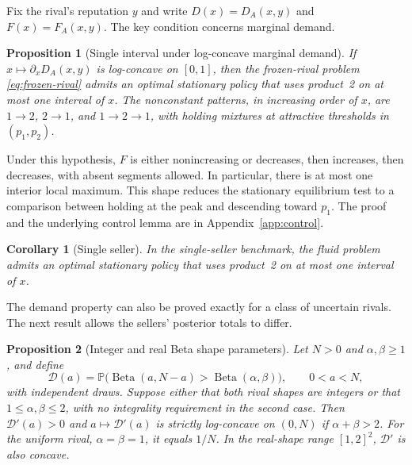 \documentclass[11pt]{article}
\newcommand{\Pb}{\mathbb P}
\DeclareMathOperator{\Beta}{Beta}
\newtheorem{proposition}{Proposition}
\newtheorem{corollary}{Corollary}
\theoremstyle{definition}
\begin{document}
Fix the rival's reputation $y$ and write $D(x)=D_A(x,y)$ and
$F(x)=F_A(x,y)$. The key condition concerns marginal demand.

\begin{proposition}[Single interval under log-concave marginal demand]
\label{prop:frozen-reduction}
If $x\mapsto\partial_xD_A(x,y)$ is log-concave on $[0,1]$, then the
frozen-rival problem \eqref{eq:frozen-rival} admits an optimal stationary
policy that uses product~2 on at most one interval of $x$. The nonconstant
patterns, in increasing order of $x$, are $1\to2$, $2\to1$, and
$1\to2\to1$, with holding mixtures at attractive thresholds in
$(p_1,p_2)$.
\end{proposition}

Under this hypothesis, $F$ is either nonincreasing or decreases, then
increases, then decreases, with absent segments allowed. In particular,
there is at most one interior local maximum. This shape reduces the
stationary equilibrium test to a comparison between holding at the peak
and descending toward $p_1$. The proof and the underlying control lemma
are in Appendix~\ref{app:control}.

\begin{corollary}[Single seller]\label{cor:single-seller}
In the single-seller benchmark, the fluid problem admits an optimal
stationary policy that uses product~2 on at most one interval of $x$.
\end{corollary}

The demand property can also be proved exactly for a class of uncertain
rivals. The next result allows the sellers' posterior totals to differ.

\begin{proposition}[Integer and real Beta shape parameters]\label{prop:integer-rival}
Let $N>0$ and $\alpha,\beta\geq1$, and define
\begin{equation*}
\mathcal D(a)=\Pb\bigl(\Beta(a,N-a)>\Beta(\alpha,\beta)\bigr),
\qquad 0<a<N,
\end{equation*}
with independent draws. Suppose either that both rival shapes are integers
or that $1\leq\alpha,\beta\leq2$, with no integrality requirement in the
second case. Then $\mathcal D'(a)>0$ and $a\mapsto\mathcal D'(a)$ is strictly
log-concave on $(0,N)$ if $\alpha+\beta>2$. For the uniform rival,
$\alpha=\beta=1$, it equals $1/N$. In the real-shape range $[1,2]^2$,
$\mathcal D'$ is also concave.
\end{proposition}
\end{document}
